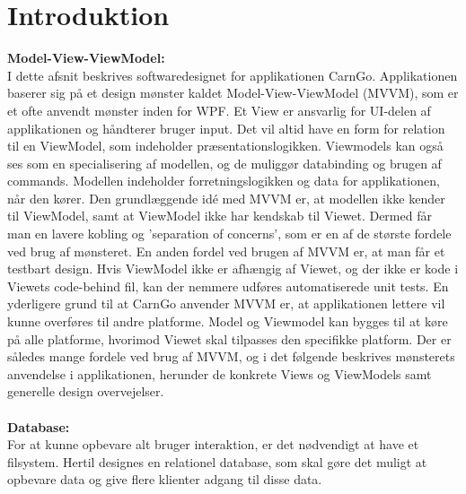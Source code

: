 \documentclass[a4paper,12pt,fleqn,oneside]{article}
\begin{document}
\section{Introduktion}
\textbf{Model-View-ViewModel:}\\
I dette afsnit beskrives softwaredesignet for applikationen CarnGo. Applikationen baserer sig på et design mønster kaldet Model-View-ViewModel (MVVM), som er et ofte anvendt mønster inden for WPF. Et View er ansvarlig for UI-delen af applikationen og håndterer bruger input. Det vil altid have en form for relation til en ViewModel, som indeholder præsentationslogikken. Viewmodels kan også ses som en specialisering af modellen, og de muliggør databinding og brugen af commands. Modellen indeholder forretningslogikken og data for applikationen, når den kører. Den grundlæggende idé med MVVM er, at modellen ikke kender til ViewModel, samt at ViewModel ikke har kendskab til Viewet. Dermed får man en lavere kobling og 'separation of concerns', som er en af de største fordele ved brug af mønsteret. En anden fordel ved brugen af MVVM er, at man får et testbart design. Hvis ViewModel ikke er afhængig af Viewet, og der ikke er kode i Viewets code-behind fil, kan der nemmere udføres automatiserede unit tests. En yderligere grund til at CarnGo anvender MVVM er, at applikationen lettere vil kunne overføres til andre platforme. Model og Viewmodel kan bygges til at køre på alle platforme, hvorimod Viewet skal tilpasses den specifikke platform. Der er således mange fordele ved brug af MVVM, og i det følgende beskrives mønsterets anvendelse i applikationen, herunder de konkrete Views og ViewModels samt generelle design overvejelser.\\\\
\textbf{Database:}\\
For at kunne opbevare alt bruger interaktion, er det nødvendigt at have et filsystem. Hertil designes en relationel database, som skal gøre det muligt at opbevare data og give flere klienter adgang til disse data. 
\end{document}
